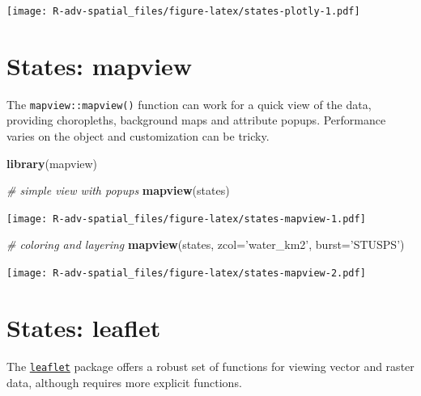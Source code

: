 \documentclass[]{book}
\newenvironment{Shaded}{\begin{snugshade}}{\end{snugshade}}
\newcommand{\KeywordTok}[1]{\textcolor[rgb]{0.13,0.29,0.53}{\textbf{{#1}}}}
\newcommand{\DataTypeTok}[1]{\textcolor[rgb]{0.13,0.29,0.53}{{#1}}}
\newcommand{\StringTok}[1]{\textcolor[rgb]{0.31,0.60,0.02}{{#1}}}
\newcommand{\CommentTok}[1]{\textcolor[rgb]{0.56,0.35,0.01}{\textit{{#1}}}}
\newcommand{\NormalTok}[1]{{#1}}
\theoremstyle{definition}
\theoremstyle{definition}
\theoremstyle{definition}
\theoremstyle{remark}
\begin{document}
\texttt{[image: R-adv-spatial\_files/figure-latex/states-plotly-1.pdf]}

\section{States: mapview}\label{states-mapview}

The \texttt{mapview::mapview()} function can work for a quick view of
the data, providing choropleths, background maps and attribute popups.
Performance varies on the object and customization can be tricky.

\begin{Shaded}
\begin{Highlighting}[]
\KeywordTok{library}\NormalTok{(mapview)}

\CommentTok{# simple view with popups}
\KeywordTok{mapview}\NormalTok{(states)}
\end{Highlighting}
\end{Shaded}

\texttt{[image: R-adv-spatial\_files/figure-latex/states-mapview-1.pdf]}

\begin{Shaded}
\begin{Highlighting}[]
\CommentTok{# coloring and layering}
\KeywordTok{mapview}\NormalTok{(states, }\DataTypeTok{zcol=}\StringTok{'water_km2'}\NormalTok{, }\DataTypeTok{burst=}\StringTok{'STUSPS'}\NormalTok{)}
\end{Highlighting}
\end{Shaded}

\texttt{[image: R-adv-spatial\_files/figure-latex/states-mapview-2.pdf]}

\section{States: leaflet}\label{states-leaflet}

The \href{http://rstudio.github.io/leaflet/}{\texttt{leaflet}} package
offers a robust set of functions for viewing vector and raster data,
although requires more explicit functions.

\begin{Shaded}
\end{Shaded}
\end{document}
